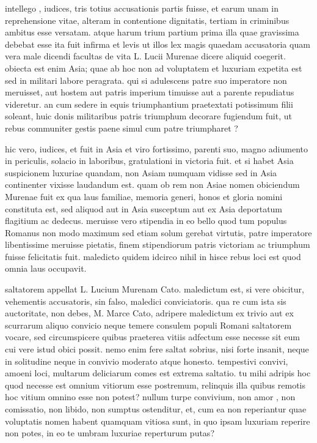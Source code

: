  intellego , iudices, tris totius accusationis partis fuisse, et earum unam in reprehensione vitae, alteram in contentione dignitatis, tertiam in criminibus ambitus esse versatam. atque harum trium partium prima illa quae gravissima debebat esse ita fuit infirma et levis ut illos lex magis quaedam accusatoria quam vera male dicendi facultas de vita L. Lucii Murenae dicere aliquid coegerit. obiecta est enim Asia; quae ab hoc non ad voluptatem et luxuriam expetita est sed in militari labore peragrata. qui si adulescens patre suo imperatore non meruisset, aut hostem aut patris imperium timuisse aut a parente repudiatus videretur. an cum sedere in equis triumphantium praetextati potissimum filii soleant, huic donis militaribus patris triumphum decorare fugiendum fuit, ut rebus communiter gestis paene simul cum patre triumpharet ?

 hic vero, iudices, et fuit in Asia et viro fortissimo, parenti suo, magno adiumento in periculis, solacio in laboribus, gratulationi in victoria fuit. et si habet Asia suspicionem luxuriae quandam, non Asiam numquam vidisse sed in Asia continenter vixisse laudandum est. quam ob rem non Asiae nomen obiciendum Murenae fuit ex qua laus familiae, memoria generi, honos et gloria nomini constituta est, sed aliquod aut in Asia susceptum aut ex Asia deportatum flagitium ac dedecus. meruisse vero stipendia in eo bello quod tum populus Romanus non modo maximum sed etiam solum gerebat virtutis, patre imperatore libentissime meruisse pietatis, finem stipendiorum patris victoriam ac triumphum fuisse felicitatis fuit. maledicto quidem idcirco nihil in hisce rebus loci est quod omnia laus occupavit.

 saltatorem appellat L. Lucium Murenam Cato. maledictum est, si vere obicitur, vehementis accusatoris, sin falso, maledici conviciatoris. qua re cum ista sis auctoritate, non debes, M. Marce Cato, adripere maledictum ex trivio aut ex scurrarum aliquo convicio neque temere consulem populi Romani saltatorem vocare, sed circumspicere quibus praeterea vitiis adfectum esse necesse sit eum cui vere istud obici possit. nemo enim fere saltat sobrius, nisi forte insanit, neque in solitudine neque in convivio moderato atque honesto. tempestivi convivi, amoeni loci, multarum deliciarum comes est extrema saltatio. tu mihi adripis hoc quod necesse est omnium vitiorum esse postremum, relinquis illa quibus remotis hoc vitium omnino esse non potest? nullum turpe convivium, non amor , non comissatio, non libido, non sumptus ostenditur, et, cum ea non reperiantur quae voluptatis nomen habent quamquam vitiosa sunt, in quo ipsam luxuriam reperire non potes, in eo te umbram luxuriae reperturum putas?

